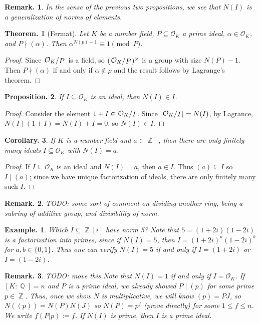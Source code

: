 \documentclass[11pt, a4paper]{memoir}
\DeclareMathOperator{\Q}{{\mathbb{Q}}}
\DeclareMathOperator{\Z}{{\mathbb{Z}}}
\newcommand{\abs}[1]{\ensuremath{\left\lvert#1\right\rvert}}
\theoremstyle{change}
\newtheorem{theorem}{Theorem.}[section]
\newtheorem{corollary}[theorem]{Corollary.}
\newtheorem{proposition}[theorem]{Proposition.}
\theoremstyle{plain}
\theoremstyle{nonumberplain}
\newtheorem{example}{Example.}
\newtheorem{remark}{Remark.}
\newtheorem{proof}{Proof}
\newcommand{\quot}[2]{\mathchoice{\left.\raisebox{0.13em}{$#1$}\middle/\raisebox{-0.13em}{$#2$}\right.}
                                 {\left.\raisebox{0.07em}{$#1$}\middle/\raisebox{-0.07em}{$#2$}\right.}
                                 {\left.\raisebox{0.03em}{$#1$}\middle/\raisebox{-0.03em}{$#2$}\right.}
                                 {\left.\raisebox{0em}{$#1$}\middle/\raisebox{0em}{$#2$}\right.}}
\numberwithin{equation}{section}
\begin{document}
\begin{remark}
    In the sense of the previous two propositions, we see that $N(I)$ is a generalization of norms of elements.
\end{remark}
\begin{theorem}[Fermat]
    Let $K$ be a number field, $P\subseteq\mathcal{O}_K$ a prime ideal, $\alpha\in\mathcal{O}_K$, and $P\nmid(\alpha)$.
    Then $\alpha^{N(p)-1}\equiv 1\pmod{P}$.
\end{theorem}
\begin{proof}
    Since $\quot{\mathcal{O}_K}{P}$ is a field, so $(\quot{\mathcal{O}_K}{P})^\times$ is a group with size $N(P)-1$.
    Then $P\nmid(\alpha)$ if and only if $\alpha\notin\rho$ and the result follows by Lagrange's theorem.
\end{proof}
\begin{proposition}\label{prop:norm-in-id}
    If $I\subseteq\mathcal{O}_K$ is an ideal, then $N(I)\in I$.
\end{proposition}
\begin{proof}
    Consider the element $1+I\in\quot{\mathcal{O}_K}{I}$.
    Since $\abs{\quot{\mathcal{O}_K}{I}}=N(I)$, by Lagrance, $N(I)(1+I)=N(I)+I=0$, so $N(I)\in I$.
\end{proof}
\begin{corollary}\label{cor:fin-norm}
    If $K$ is a number field and $a\in\Z^+$, then there are only finitely many ideals $I\subseteq\mathcal{O}_K$ with $N(I)=a$.
\end{corollary}
\begin{proof}
    If $I\subseteq\mathcal{O}_K$ is an ideal and $N(I)=a$, then $a\in I$.
    Thus $(a)\subseteq I$ so $I\mid (a)$; since we have unique factorization of ideals, there are only finitely many such $I$.
\end{proof}
\begin{remark}
    TODO: some sort of comment on dividing another ring, being a subring of additive group, and divisibility of norm.
\end{remark}
\begin{example}
    Which $I\subseteq\Z[i]$ have norm 5?
    Note that $5=(1+2i)(1-2i)$ is a factorization into primes, since if $N(I)=5$, then $I=(1+2i)^a(1-2i)^b$ for $a,b\in\{0,1\}$.
    Thus one can verify $N(I)=5$ if and only if $I=(1+2i)$ or $I=(1-2i)$.
\end{example}
\begin{remark}
    TODO: move this
    Note that $N(I)=1$ if and only if $I=\mathcal{O}_K$.
    If $[K:\Q]=n$ and $P$ is a prime ideal, we already showed $P\mid(p)$ for some prime $p\in\Z$.
    Thus, once we show $N$ is multiplicative, we will know $(p)=P J$, so $N((p))=N(P)N(J)$ so $N(P)=p^f$ (prove directly) for some $1\leq f\leq n$.
    We write $f(P|p):=f$.
    If $N(I)$ is prime, then $I$ is a prime ideal.
\end{remark}
\end{document}
